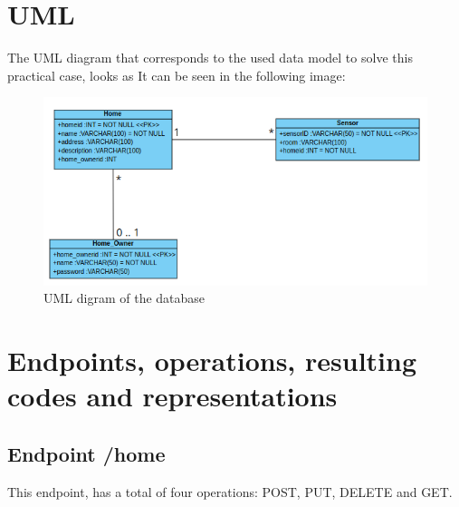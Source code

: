 \documentclass[a4paper,12pt]{article}
\begin{document}
	\begin{titlepage}
		\maketitle
		\thispagestyle{empty}
	\end{titlepage}
	\cleardoublepage
	\newpage

\tableofcontents
\listoffigures
\thispagestyle{empty}

\newpage
\section*{UML}
The UML diagram that corresponds to the used data model to solve this practical case, looks as It can be seen in the following image:
\begin{figure}[H]
    \centering
    \includegraphics[scale = 0.7]{images/UML project 2.png}
    \caption{UML digram of the database}
    \label{fig:uml}
\end{figure}

\section*{Endpoints, operations, resulting codes and representations}
\subsection*{Endpoint /home}
This endpoint, has a total of four operations: POST, PUT, DELETE and GET.
\end{document}

